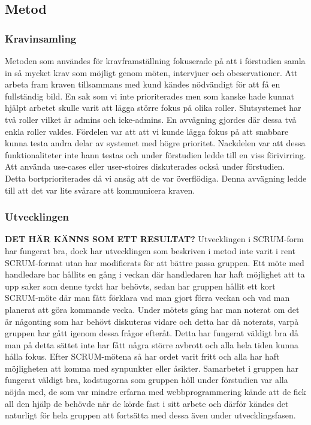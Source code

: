 \documentclass{article}
\begin{document}
  
\subsection{Metod}

\subsubsection{Kravinsamling}
Metoden som användes för kravframställning fokuserade på att i förstudien samla in så mycket krav som möjligt genom möten, intervjuer och obeservationer. Att arbeta fram kraven tillsammans med kund kändes nödvändigt för att få en fullständig bild. En sak som vi inte prioriterades men som kanske hade kunnat hjälpt arbetet skulle varit att lägga större fokus på olika roller. Slutsystemet har två roller vilket är admins och icke-admins. En avvägning gjordes där dessa två enkla roller valdes. Fördelen var att att vi kunde lägga fokus på att snabbare kunna testa andra delar av systemet med högre prioritet. Nackdelen var att dessa funktionaliteter inte hann testas och under förstudien ledde till en viss förivirring. %
Att använda use-cases eller user-stoires diskuterades också under förstudien. Detta bortprioriterades då vi ansåg att de var överflödiga. Denna avvägning ledde till att det var lite svårare att kommunicera kraven. 

\subsubsection{Utvecklingen}
\textbf{DET HÄR KÄNNS SOM ETT RESULTAT?}
Utvecklingen i SCRUM-form har fungerat bra, dock har utvecklingen som beskriven i metod inte varit i rent SCRUM-format utan har modifierats för att bättre passa gruppen. Ett möte med handledare har hållits en gång i veckan där handledaren har haft möjlighet att ta upp saker som denne tyckt har behövts, sedan har gruppen hållit ett kort SCRUM-möte där man fått förklara vad man gjort förra veckan och vad man planerat att göra kommande vecka. Under mötets gång har man noterat om det är någonting som har behövt diskuteras vidare och detta har då noterats, varpå gruppen har gått igenom dessa frågor efteråt. Detta har fungerat väldigt bra då man på detta sättet inte har fått några större avbrott och alla hela tiden kunna hålla fokus. Efter SCRUM-mötena så har ordet varit fritt och alla har haft möjligheten att komma med synpunkter eller åsikter. Samarbetet i gruppen har fungerat väldigt bra, kodstugorna som gruppen höll under förstudien var alla nöjda med, de som var mindre erfarna med webbprogrammering kände att de fick all den hjälp de behövde när de körde fast i sitt arbete och därför kändes det naturligt för hela gruppen att fortsätta med dessa även under utvecklingsfasen.
\end{document}
